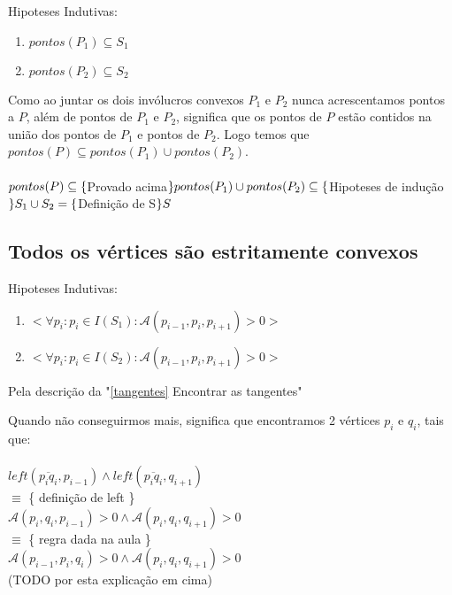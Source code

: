 \documentclass[11pt]{article}
\begin{document}
Hipoteses Indutivas:
\begin{enumerate}
    \item $pontos(P_1) \subseteq S_1$
    \item $pontos(P_2) \subseteq S_2$
\end{enumerate}
Como ao juntar os dois invólucros convexos $P_1$ e $P_2$
nunca acrescentamos pontos a $P$, além de pontos de $P_1$ e $P_2$, 
significa que os pontos de $P$ estão contidos na 
união dos pontos de $P_1$ e pontos de $P_2$.
Logo temos que $pontos(P) \subseteq pontos(P_1) \cup pontos(P_2)$.\\ \\
$pontos(P) \\
\subseteq \{$Provado acima$\}\\
pontos(P_1) \cup pontos(P_2) \\
\subseteq \{$Hipoteses de indução$\} \\
S_1 \cup S_2 \\
= \{$Definição de S$\}\\
S$


\subsection{Todos os vértices são estritamente convexos}

Hipoteses Indutivas:
\begin{enumerate}
    \item $< \forall p_i : p_i \in I(S_1) : \mathcal{A}(p_{i-1}, p_i, p_{i+1}) > 0 >$
    \item $< \forall p_i : p_i \in I(S_2) : \mathcal{A}(p_{i-1}, p_i, p_{i+1}) > 0 >$
\end{enumerate}


Pela descrição da "\ref{tangentes} Encontrar as tangentes"
\par

Quando não conseguirmos mais, significa que encontramos 2 vértices 
$p_i$ e $q_i$, tais que:\\
\\
$left(\overline{p_i q_i}, p_{i-1}) \wedge left(\overline{p_i q_i}, q_{i+1})$\\
$\equiv$ \{ definição de left \}\\
$\mathcal{A}(p_i, q_i, p_{i-1}) > 0 \wedge \mathcal{A}(p_i, q_i, q_{i+1}) > 0$\\
$\equiv$ \{ regra dada na aula \}\\
$\mathcal{A}(p_{i-1}, p_i, q_i) > 0 \wedge \mathcal{A}(p_i, q_i, q_{i+1}) > 0$\\
(TODO por esta explicação em cima)\\
\end{document}
